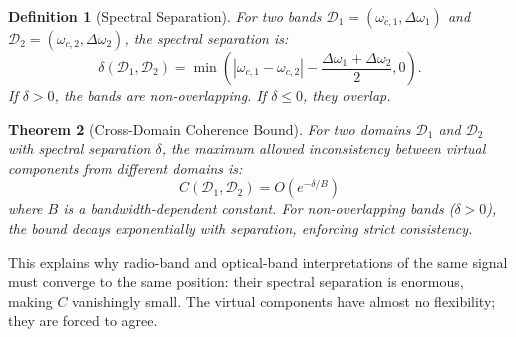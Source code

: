 \documentclass[twocolumn,11pt,a4paper]{article}
\newtheorem{theorem}{Theorem}[section]
\newtheorem{definition}[theorem]{Definition}
\newcommand{\bandwidth}{\Delta{\omega}}
\newcommand{\domain}{\mathcal{D}}
\newcommand{\freq}{\omega}
\begin{document}
\begin{definition}[Spectral Separation]
For two bands $\domain_1 = (\freq_{c,1}, \bandwidth_1)$ and $\domain_2 = (\freq_{c,2}, \bandwidth_2)$, the \emph{spectral separation} is:
\begin{equation}
  \delta(\domain_1, \domain_2) = \min\left( |\freq_{c,1} - \freq_{c,2}| - \frac{\bandwidth_1 + \bandwidth_2}{2}, 0 \right).
\end{equation}
If $\delta > 0$, the bands are non-overlapping. If $\delta \leq 0$, they overlap.
\end{definition}

\begin{theorem}[Cross-Domain Coherence Bound]
For two domains $\domain_1$ and $\domain_2$ with spectral separation $\delta$, the maximum allowed inconsistency between virtual components from different domains is:
\begin{equation}
  C(\domain_1, \domain_2) = O(e^{-\delta / B})
\end{equation}
where $B$ is a bandwidth-dependent constant. For non-overlapping bands ($\delta > 0$), the bound decays exponentially with separation, enforcing strict consistency.
\end{theorem}

This explains why radio-band and optical-band interpretations of the same signal must converge to the same position: their spectral separation is enormous, making $C$ vanishingly small. The virtual components have almost no flexibility; they are forced to agree.
\end{document}

